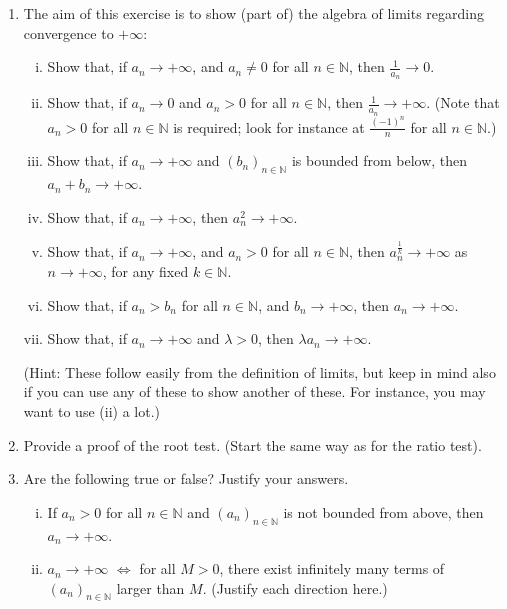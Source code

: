 \documentclass[11pt]{amsart}
\newcommand\N{{\mathbb N}}
\theoremstyle{plain}
\theoremstyle{definition}
\numberwithin{equation}{section}
\begin{document}
\begin{enumerate}
\item The aim of this exercise is to show (part of) the algebra of limits regarding convergence to $+\infty$:
\begin{enumerate}[(i)]
\item Show that, if $a_n\rightarrow +\infty$, and $a_n\neq 0$ for all $n\in\N$, then $\frac{1}{a_n}\rightarrow 0$.
\item Show that, if $a_n\rightarrow 0$ and $a_n>0$ for all $n\in\N$, then $\frac{1}{a_n}\rightarrow +\infty$. (Note that $a_n>0$ for all $n\in\N$ is required; look for instance at $\frac{(-1)^n}{n}$ for all $n\in\N$.)
\item Show that, if $a_n\rightarrow +\infty$ and $(b_n)_{n\in\N}$ is bounded from below, then $a_n+b_n\rightarrow +\infty$.
\item Show that, if $a_n\rightarrow +\infty$, then $a_n^2\rightarrow +\infty$.
\item Show that, if $a_n\rightarrow +\infty$, and $a_n>0$ for all $n\in\N$, then $a_n^{\frac{1}{k}}\rightarrow +\infty$ as $n\rightarrow +\infty$, for any fixed $k\in\N$.
\item Show that, if $a_n>b_n$ for all $n\in\N$, and $b_n\rightarrow +\infty$, then $a_n\rightarrow +\infty$.
\item Show that, if $a_n\rightarrow +\infty$ and $\lambda >0$, then $\lambda a_n\rightarrow +\infty$.
\end{enumerate}
\vspace{0.1in}

(Hint: These follow easily from the definition of limits, but keep in mind also if you can use any of these to show another of these. For instance, you may want to use (ii) a lot.)
\vspace{0.4in}

\item Provide a proof of the root test. (Start the same way as for the ratio test).
\vspace{0.4in}

\item Are the following true or false? Justify your answers.
\begin{enumerate}[(i)]
\item If $a_n>0$ for all $n\in\N$ and $(a_n)_{n\in\N}$ is not bounded from above, then $a_n\rightarrow +\infty$.
\item $a_n\rightarrow +\infty$ $\Leftrightarrow$ for all $M>0$, there exist infinitely many terms of $(a_n)_{n\in\N}$ larger than $M$. (Justify each direction here.)
\end{enumerate}
\vspace{0.4in}


\end{enumerate}
\end{document}
